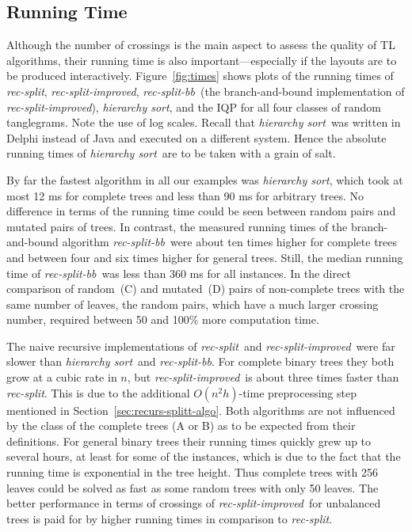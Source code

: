 \documentclass[runningheads,a4paper]{llncs}
\newcommand{\recsplit}{\emph{rec-split}}
\newcommand{\recimproved}{\emph{rec-split-improved}}
\newcommand{\recbb}{\emph{rec-split-bb}}
\newcommand{\hiersort}{\emph{hierarchy sort}}
\begin{document}
\subsection{Running Time}\label{sec:runn-time-perf}

Although the number of crossings is the main aspect to assess the
quality of TL algorithms, their running time is also
important---especially if the layouts are to be produced
interactively. Figure~\ref{fig:times} shows plots of the running times
of \recsplit, \recimproved, \recbb\ (the branch-and-bound
implementation of \recimproved), \hiersort, and the IQP for all four
classes of random tanglegrams.  Note the use of log scales.  
Recall that \hiersort\ was written in
Delphi instead of Java and executed on a different system. Hence the
absolute running times of \hiersort\ are to be taken with a grain of
salt. 

By far the fastest algorithm in all our examples was \hiersort,
which took at most 12 ms for complete trees and less than 90 ms for
arbitrary trees. No difference in terms of the running time could be
seen between random pairs and mutated pairs of trees. In contrast,
the measured running times of the branch-and-bound algorithm \recbb\
were about ten times higher for complete trees and between four and
six times higher for general trees. Still, the median running time
of \recbb\ was less than 360 ms for all instances. In the direct
comparison of random~(C) and mutated~(D) pairs of non-complete trees
with the same number of leaves, the random pairs, which have a much
larger crossing number, required between 50 and 100\% more computation
time.

The naive recursive implementations of \recsplit\ and \recimproved\
were far slower than \hiersort\ and \recbb. For complete binary
trees they both grow at a cubic rate in $n$, but \recimproved\ is
about three times faster than \recsplit. This is due to the additional
$O(n^2 h)$-time 
preprocessing step mentioned in Section~\ref{sec:recurs-splitt-algo}.
Both algorithms
are not influenced by the class of the complete trees (A or B) as to
be expected from their definitions. For general binary trees their
running times quickly grew up to several hours, at least for some of
the instances, which is due to the fact that the
running time is exponential in the tree height. Thus
complete trees with 256 leaves could be solved as fast as
some random trees with only 50 leaves. The better performance in
terms of crossings of \recimproved\ for unbalanced trees is paid for
by higher running times in comparison to \recsplit.
\end{document}
